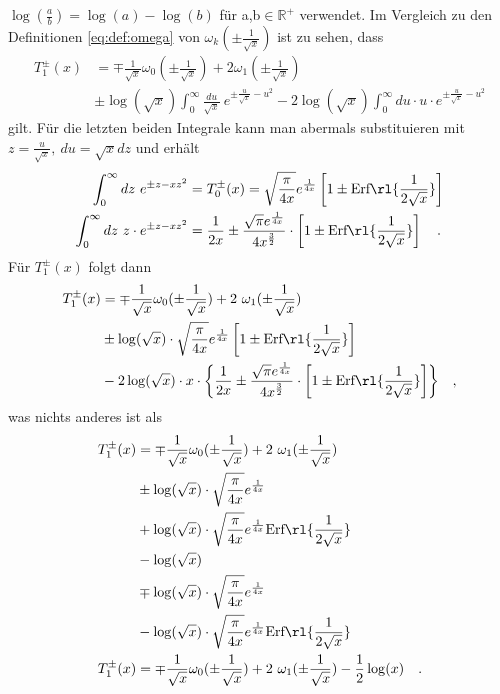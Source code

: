 $\log(\frac{a}{b})=\log(a)-\log(b)$ für a,b$\in\mathbb{R}^+$ 
verwendet. Im Vergleich zu den Definitionen \ref{eq:def:omega} von 
$\omega_k(\pm\frac{1}{\sqrt{x}})$ ist zu sehen, dass
\begin{align*}
T_1^\pm(x)&= \mp \frac{1}{\sqrt{x}} \omega_0(\pm 
\frac{1}{\sqrt{x}}) + 2\omega_1(\pm\frac{1}{\sqrt{x}}) \\
& \pm \log(\sqrt{x})\int_{0}^{\infty}\frac{du}{\sqrt{x}}\ 
e^{\pm\frac{u}{\sqrt{x}}-u^2 }
-2 \log(\sqrt{x})\int_{0}^{\infty}du\cdot u\cdot 
e^{\pm\frac{u}{\sqrt{x}}-u^2 }
\end{align*}
gilt. Für die letzten beiden Integrale kann man abermals 
substituieren mit  
$z=\frac{u}{\sqrt{x}},\ du=\sqrt{x}dz$ und erhält
\begin{align}
\int_{0}^{\infty}dz \ e^{\pm z -x z^2} &=T_0^\pm(x)= 
\sqrt{\frac{\pi}{4x}}e^{\frac{1}{4x}}\left[1\pm 
\text{Erf}\rl{\frac{1}{2\sqrt{x}}}\right]\\
\int_{0}^{\infty}dz\ z\cdot e^{\pm z -x z^2}&=\frac{1}{2x}\pm 
\frac{\sqrt{\pi}e^{\frac{1}{4x}}}{4x^{\frac{3}{2}}}\cdot 
\left[1\pm \text{Erf}\rl{\frac{1}{2\sqrt{x}}}\right]\quad.
\end{align}
Für $T_1^\pm(x)$ folgt dann
\begin{align*}
T_1^\pm(x)&= \mp \frac{1}{\sqrt{x}} \omega_0(\pm 
\frac{1}{\sqrt{x}}) + 2\ \omega_1(\pm\frac{1}{\sqrt{x}}) \\
& \pm \log(\sqrt{x})\cdot 
\sqrt{\frac{\pi}{4x}}e^{\frac{1}{4x}}\left[1\pm 
\text{Erf}\rl{\frac{1}{2\sqrt{x}}}\right]\\
&-2\log(\sqrt{x})\cdot x\cdot \biggl\{  
\frac{1}{2x}\pm 
\frac{\sqrt{\pi}e^{\frac{1}{4x}}}{4x^{\frac{3}{2}}}\cdot 
\left[1\pm \text{Erf}\rl{\frac{1}{2\sqrt{x}}}\right]
\biggr\}\quad,
\end{align*}
was nichts anderes ist als
\begin{align}\nonumber
T_1^\pm(x)&= \mp \frac{1}{\sqrt{x}} \omega_0(\pm 
\frac{1}{\sqrt{x}}) + 2\ \omega_1(\pm\frac{1}{\sqrt{x}}) 
\\\nonumber
& \pm \log(\sqrt{x})\cdot 
\sqrt{\frac{\pi}{4x}}e^{\frac{1}{4x}}\\\nonumber
& +\log(\sqrt{x})\cdot 
\sqrt{\frac{\pi}{4x}}e^{\frac{1}{4x}}\text{Erf}\rl{\frac{1}{2\sqrt{x}}}\\\nonumber
& -\log(\sqrt{x})\\\nonumber
& \mp\log(\sqrt{x})\cdot 
\sqrt{\frac{\pi}{4x}}e^{\frac{1}{4x}}\\\nonumber
& -\log(\sqrt{x})\cdot 
\sqrt{\frac{\pi}{4x}}e^{\frac{1}{4x}}\text{Erf}\rl{\frac{1}{2\sqrt{x}}}\\
%
T_1^\pm(x)&= \mp \frac{1}{\sqrt{x}} \omega_0(\pm 
\frac{1}{\sqrt{x}}) + 2\ 
\omega_1(\pm\frac{1}{\sqrt{x}})-\frac12 \log(x)\quad.
\end{align}

